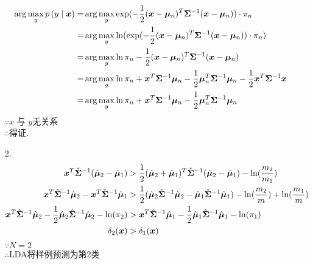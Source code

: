 \documentclass[answers]{exam}  %
\begin{document}
\begin{questions}
\begin{solution}
\begin{enumerate}
			      \begin{align*}
				      \arg\max_y p\left(y\mid {\boldsymbol{x}}\right)= & \arg\max_y \exp(-\frac{1}{2} ({\boldsymbol{x}}-\boldsymbol{\mu}_n)^T\boldsymbol{\Sigma}^{-1}({\boldsymbol{x}}-\boldsymbol{\mu}_n))\cdot \pi_n                                     \\
				      =                                   & \arg\max_y \ln(\exp(-\frac{1}{2} ({\boldsymbol{x}}-\boldsymbol{\mu}_n)^T\boldsymbol{\Sigma}^{-1}({\boldsymbol{x}}-\boldsymbol{\mu}_n))\cdot \pi_n)                                \\
				      =                                   & \arg\max_y \ln \pi_n-\frac{1}{2} ({\boldsymbol{x}}-\boldsymbol{\mu}_n)^T\boldsymbol{\Sigma}^{-1}({\boldsymbol{x}}-\boldsymbol{\mu}_n)                                             \\
				      =                                   & \arg\max_y \ln \pi_n+{\boldsymbol{x}}^T\boldsymbol{\Sigma}^{-1}\boldsymbol{\mu}_n-\frac{1}{2}\boldsymbol{\mu}_n^T\boldsymbol{\Sigma}^{-1}\boldsymbol{\mu}_n-\frac{1}{2} {\boldsymbol{x}}^T\boldsymbol{\Sigma}^{-1}{\boldsymbol{x}} \\
				      =                                   & \arg\max_y \ln \pi_n+{\boldsymbol{x}}^T\boldsymbol{\Sigma}^{-1}\boldsymbol{\mu}_n-\frac{1}{2}\boldsymbol{\mu}_n^T\boldsymbol{\Sigma}^{-1}\boldsymbol{\mu}_n
			      \end{align*}
			      $\because x\text{ 与 }y$无关系\\
			      $\therefore $得证.
			\item[2.]
			      \begin{align*}
				      {\boldsymbol{x}}^T\hat{\boldsymbol{\Sigma}}^{-1}(\hat{\boldsymbol{\mu}}_2-\hat{\boldsymbol{\mu}}_1)                                                    & >\frac{1}{2} (\hat{\boldsymbol{\mu}}_2+\hat{\boldsymbol{\mu}}_1)^T\hat{\boldsymbol{\Sigma}}^{-1}(\hat{\boldsymbol{\mu}}_2-\hat{\boldsymbol{\mu}}_1)-\ln (\frac{m_2}{m_1} )                                \\
				      {\boldsymbol{x}}^T\hat{\boldsymbol{\Sigma}}^{-1}\hat{\boldsymbol{\mu}}_2-{\boldsymbol{x}}^T\hat{\boldsymbol{\Sigma}}^{-1}\hat{\boldsymbol{\mu}}_1                               & >\frac{1}{2} (\hat{\boldsymbol{\mu}}_2\hat{\boldsymbol{\Sigma}}^{-1}\hat{\boldsymbol{\mu}}_2-\hat{\boldsymbol{\mu}}_1\hat{\boldsymbol{\Sigma}}^{-1}\hat{\boldsymbol{\mu}}_1)-\ln (\frac{m_2}{m} )+\ln (\frac{m_1}{m}) \\
				      {\boldsymbol{x}}^T\hat{\boldsymbol{\Sigma}}^{-1}\hat{\boldsymbol{\mu}}_2-\frac{1}{2} \hat{\boldsymbol{\mu}}_2\hat{\boldsymbol{\Sigma}}^{-1}\hat{\boldsymbol{\mu}}_2-\ln(\pi_2) & >{\boldsymbol{x}}^T\hat{\boldsymbol{\Sigma}}^{-1}\hat{\boldsymbol{\mu}}_1-\frac{1}{2} \hat{\boldsymbol{\mu}}_1\hat{\boldsymbol{\Sigma}}^{-1}\hat{\boldsymbol{\mu}}_1-\ln(\pi_1)                                        \\
				      \delta_2({\boldsymbol{x}})                                                                                         & >\delta_1({\boldsymbol{x}})
			      \end{align*}
			      $\because N=2$\\
			      $\therefore$LDA将样例预测为第2类
		\end{enumerate}
	\end{solution}



\end{questions}
\end{document}
